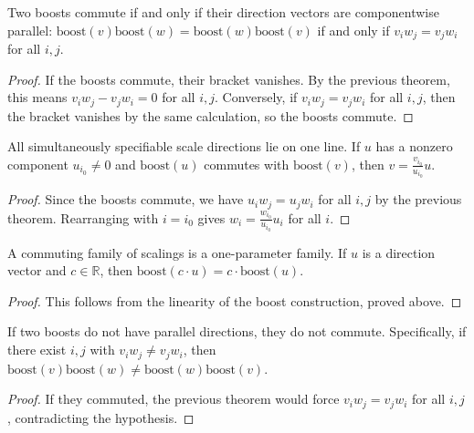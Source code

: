 \begin{theorem}
Two boosts commute if and only if their direction vectors are componentwise parallel:
$\text{boost}(v) \text{boost}(w) = \text{boost}(w) \text{boost}(v)$ if and only if
$v_i w_j = v_j w_i$ for all $i, j$.
\end{theorem}
\begin{proof}
If the boosts commute, their bracket vanishes. By the previous theorem, this means $v_i w_j - v_j w_i = 0$
for all $i, j$. Conversely, if $v_i w_j = v_j w_i$ for all $i, j$, then the bracket vanishes by the same calculation,
so the boosts commute.
\end{proof}

\begin{theorem}
All simultaneously specifiable scale directions lie on one line. If $u$ has a nonzero component
$u_{i_0} \neq 0$ and $\text{boost}(u)$ commutes with $\text{boost}(v)$, then
$v = \frac{v_{i_0}}{u_{i_0}} u.$
\end{theorem}
\begin{proof}
Since the boosts commute, we have $u_i w_j = u_j w_i$ for all $i, j$ by the previous theorem.
Rearranging with $i = i_0$ gives $w_i = \frac{w_{i_0}}{u_{i_0}} u_i$ for all $i$.
\end{proof}

\begin{theorem}
A commuting family of scalings is a one-parameter family. If $u$ is a direction vector and $c \in \mathbb{R}$,
then $\text{boost}(c \cdot u) = c \cdot \text{boost}(u)$.
\end{theorem}
\begin{proof}
This follows from the linearity of the boost construction, proved above.
\end{proof}

\begin{theorem}
If two boosts do not have parallel directions, they do not commute. Specifically, if there exist
$i, j$ with $v_i w_j \neq v_j w_i$, then $\text{boost}(v) \text{boost}(w) \neq \text{boost}(w) \text{boost}(v)$.
\end{theorem}
\begin{proof}
If they commuted, the previous theorem would force $v_i w_j = v_j w_i$ for all $i, j$, contradicting the hypothesis.
\end{proof}

